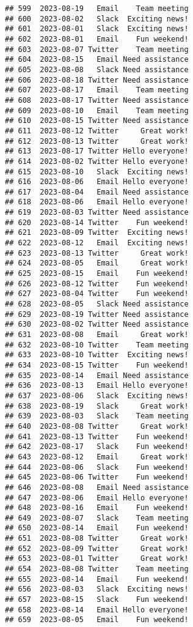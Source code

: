 \documentclass[
]{article}
\begin{document}
\begin{verbatim}
## 599  2023-08-19   Email    Team meeting
## 600  2023-08-02   Slack  Exciting news!
## 601  2023-08-01   Slack  Exciting news!
## 602  2023-08-01   Email    Fun weekend!
## 603  2023-08-07 Twitter    Team meeting
## 604  2023-08-15   Email Need assistance
## 605  2023-08-08   Slack Need assistance
## 606  2023-08-18 Twitter Need assistance
## 607  2023-08-17   Email    Team meeting
## 608  2023-08-17 Twitter Need assistance
## 609  2023-08-10   Email    Team meeting
## 610  2023-08-15 Twitter Need assistance
## 611  2023-08-12 Twitter     Great work!
## 612  2023-08-13 Twitter     Great work!
## 613  2023-08-17 Twitter Hello everyone!
## 614  2023-08-02 Twitter Hello everyone!
## 615  2023-08-10   Slack  Exciting news!
## 616  2023-08-06   Email Hello everyone!
## 617  2023-08-04   Email Need assistance
## 618  2023-08-06   Email Hello everyone!
## 619  2023-08-03 Twitter Need assistance
## 620  2023-08-14 Twitter    Fun weekend!
## 621  2023-08-09 Twitter  Exciting news!
## 622  2023-08-12   Email  Exciting news!
## 623  2023-08-13 Twitter     Great work!
## 624  2023-08-05   Email     Great work!
## 625  2023-08-15   Email    Fun weekend!
## 626  2023-08-12 Twitter    Fun weekend!
## 627  2023-08-04 Twitter    Fun weekend!
## 628  2023-08-05   Slack Need assistance
## 629  2023-08-19 Twitter Need assistance
## 630  2023-08-02 Twitter Need assistance
## 631  2023-08-08   Email     Great work!
## 632  2023-08-10 Twitter    Team meeting
## 633  2023-08-10 Twitter  Exciting news!
## 634  2023-08-15 Twitter    Fun weekend!
## 635  2023-08-14   Email Need assistance
## 636  2023-08-13   Email Hello everyone!
## 637  2023-08-06   Slack  Exciting news!
## 638  2023-08-19   Slack     Great work!
## 639  2023-08-03   Slack    Team meeting
## 640  2023-08-08 Twitter     Great work!
## 641  2023-08-13 Twitter    Fun weekend!
## 642  2023-08-17   Slack    Fun weekend!
## 643  2023-08-12   Email     Great work!
## 644  2023-08-06   Slack    Fun weekend!
## 645  2023-08-06 Twitter    Fun weekend!
## 646  2023-08-08   Email Need assistance
## 647  2023-08-06   Email Hello everyone!
## 648  2023-08-16   Email    Fun weekend!
## 649  2023-08-07   Slack    Team meeting
## 650  2023-08-14   Email    Fun weekend!
## 651  2023-08-08 Twitter     Great work!
## 652  2023-08-09 Twitter     Great work!
## 653  2023-08-01 Twitter     Great work!
## 654  2023-08-08 Twitter    Team meeting
## 655  2023-08-14   Email    Fun weekend!
## 656  2023-08-03   Slack  Exciting news!
## 657  2023-08-15   Slack    Fun weekend!
## 658  2023-08-14   Email Hello everyone!
## 659  2023-08-05   Email    Fun weekend!

\end{verbatim}
\end{document}
